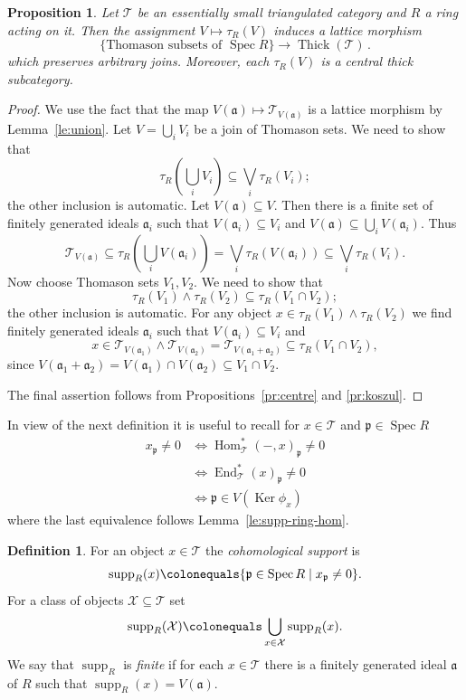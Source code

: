\documentclass{amsart}[a4]
\newtheorem{proposition}[theorem]{Proposition}
\theoremstyle{definition}
\newtheorem{definition}[theorem]{Definition}
\theoremstyle{remark}
\numberwithin{equation}{section}
\newcommand{\End}{\operatorname{End}}
\newcommand{\Hom}{\operatorname{Hom}}
\newcommand{\Ker}{\operatorname{Ker}}
\newcommand{\Spec}{\operatorname{Spec}}
\newcommand{\supp}{\operatorname{supp}}
\newcommand{\Thick}{\operatorname{Thick}}
\newcommand{\lto}{\longrightarrow}
\newcommand{\cat}{\mathcal}
\newcommand{\fa}{\mathfrak{a}}
\newcommand{\fp}{\mathfrak{p}}
\begin{document}
\begin{proposition}\label{pr:Thomason}
 Let $\cat T$ be an essentially small triangulated category and $R$ a ring acting on
  it.   Then the assignment $V\mapsto \tau_R(V)$  induces a lattice morphism
  \begin{equation*}
  \label{eq:tau}
  \{\text{Thomason subsets of }\Spec
  R\}\lto\Thick(\cat T)\,.
\end{equation*}  
which preserves arbitrary joins. Moreover, each $\tau_R(V)$ is a
central thick subcategory.
\end{proposition}
\begin{proof}
We use the fact that the map $V(\fa)\mapsto\cat T_{V(\fa)}$ is
a lattice morphism by Lemma~\ref{le:union}. Let $V=\bigcup_i V_i$ be a
join of Thomason sets. We need to show that
\[\tau_R\left(\bigcup_i V_i\right)\subseteq \bigvee_i \tau_R(V_i);\]
the other inclusion is automatic. Let $V(\fa)\subseteq V$. Then there is a finite set of finitely
generated ideals $\fa_i$ such that $V(\fa_i)\subseteq V_i$ and
$V(\fa)\subseteq \bigcup_i V(\fa_i)$. Thus
\[\cat T_{V(\fa)}\subseteq \tau_R\left(\bigcup_i V(\fa_i)\right) =
  \bigvee_i \tau_R(V(\fa_i))\subseteq \bigvee_i \tau_R(V_i).\]
Now choose Thomason sets $V_1,V_2$. We need to show that
\[\tau_R(V_1)\wedge\tau_R(V_2)\subseteq\tau_R(V_1\cap V_2);\]
the other inclusion is automatic. For any object $x\in \tau_R(V_1)\wedge\tau_R(V_2)$ we find finitely
generated ideals $\fa_i$ such that  $V(\fa_i)\subseteq  V_i$ and
\[x\in\cat T_{V(\fa_1)}\wedge\cat T_{V(\fa_2)}=\cat
  T_{V(\fa_1+\fa_2)}\subseteq \tau_R(V_1\cap V_2),\]
since $V(\fa_1+\fa_2)=V(\fa_1)\cap V(\fa_2)\subseteq V_1\cap V_2$.

The final assertion follows from  Propositions~\ref{pr:centre} and \ref{pr:koszul}.
\end{proof}


In view of the next definition it is useful to recall for $x\in\cat T$
and $\fp\in\Spec R$
\begin{align*}
  x_\fp\neq 0&\iff\Hom^*_\cat T(-,x)_\fp\neq 0\\
             &\iff\End^*_\cat T(x)_\fp\neq 0\\
             &\iff\fp\in V(\Ker\phi_x)
\end{align*}
where the last equivalence follows Lemma~\ref{le:supp-ring-hom}.

\begin{definition}
  For an object $x\in \cat T$ the \emph{cohomological support} is
  \[ \supp_R(x) \colonequals \{\fp\in\Spec R\mid x_\fp\neq 0 \}.\] For
  a class of objects $\cat X\subseteq\cat T$ set
\[\supp_R(\cat X) \colonequals\bigcup_{x\in\cat X}\supp_R(x).\]
We say that $\supp_R$ is \emph{finite} if for each $x\in\cat T$ there
is a finitely generated ideal $\fa$ of $R$ such that
$\supp_R(x)=V(\fa)$.
\end{definition}
\end{document}
